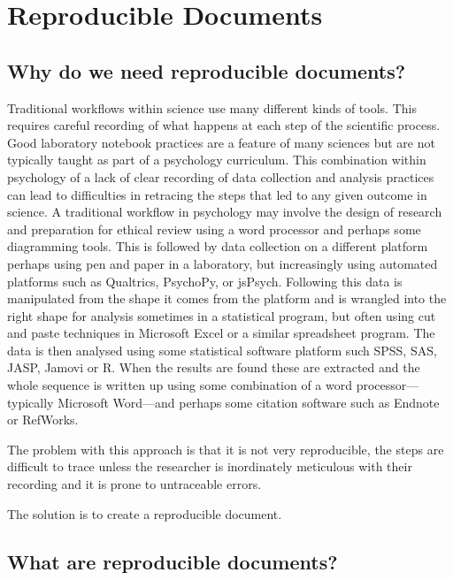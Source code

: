 \documentclass[
  letterpaper,
  DIV=11,
  numbers=noendperiod]{scrreprt}
\author{}
\date{}
\begin{document}
\chapter{Reproducible Documents}\label{reproducible-documents}

\section{Why do we need reproducible
documents?}\label{why-do-we-need-reproducible-documents}

Traditional workflows within science use many different kinds of tools.
This requires careful recording of what happens at each step of the
scientific process. Good laboratory notebook practices are a feature of
many sciences but are not typically taught as part of a psychology
curriculum. This combination within psychology of a lack of clear
recording of data collection and analysis practices can lead to
difficulties in retracing the steps that led to any given outcome in
science. A traditional workflow in psychology may involve the design of
research and preparation for ethical review using a word processor and
perhaps some diagramming tools. This is followed by data collection on a
different platform perhaps using pen and paper in a laboratory, but
increasingly using automated platforms such as Qualtrics, PsychoPy, or
jsPsych. Following this data is manipulated from the shape it comes from
the platform and is wrangled into the right shape for analysis sometimes
in a statistical program, but often using cut and paste techniques in
Microsoft Excel or a similar spreadsheet program. The data is then
analysed using some statistical software platform such SPSS, SAS, JASP,
Jamovi or R. When the results are found these are extracted and the
whole sequence is written up using some combination of a word
processor---typically Microsoft Word---and perhaps some citation
software such as Endnote or RefWorks.

The problem with this approach is that it is not very reproducible, the
steps are difficult to trace unless the researcher is inordinately
meticulous with their recording and it is prone to untraceable errors.

The solution is to create a reproducible document.

\section{What are reproducible
documents?}\label{what-are-reproducible-documents}
\end{document}
